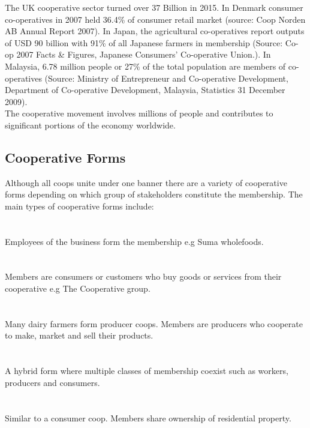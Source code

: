 The UK cooperative sector turned over 37 Billion in 2015\cite{Cooperative_economy}. In Denmark consumer co-operatives in 2007 held 36.4\% of consumer retail market (source: Coop Norden AB Annual Report 2007). In Japan, the agricultural co-operatives report outputs of USD 90 billion with 91\% of all Japanese farmers in membership (Source: Co-op 2007 Facts \& Figures, Japanese Consumers' Co-operative Union.). In Malaysia, 6.78 million people or 27\% of the total population are members of co-operatives (Source: Ministry of Entrepreneur and Co-operative Development, Department of Co-operative Development, Malaysia, Statistics 31 December 2009).\\

The cooperative movement involves millions of people and contributes to significant portions of the economy worldwide.\\

\subsection{Cooperative Forms}
Although all coops unite under one banner there are a variety of cooperative forms depending on which group of stakeholders constitute the membership. The main types of cooperative forms include:\\\\
\\
Employees of the business form the membership e.g Suma wholefoods\cite{Suma}.\\\\
\\
Members are consumers or customers who buy goods or services from their cooperative e.g The Cooperative group\cite{TheCoop}.\\\\
\\
Many dairy farmers form producer coops. Members are producers who cooperate to make, market and sell their products.\\\\
\\
A hybrid form where multiple classes of membership coexist such as workers, producers and consumers.\\\\
\\
Similar to a consumer coop. Members share ownership of residential property. \\


